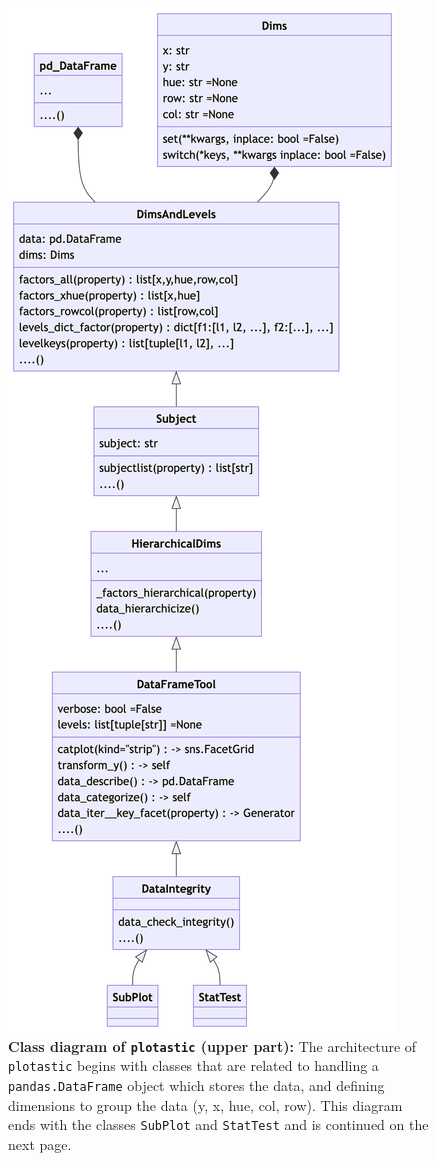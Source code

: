 \def\mycap{ \textbf{Class diagram of \texttt{plotastic} (upper part):} The
    architecture of \texttt{plotastic} begins with classes that are related to
    handling a \texttt{pandas.DataFrame} object which stores the data, and defining
    dimensions to group the data (y, x, hue, col, row). This diagram ends with the
    classes \texttt{SubPlot} and \texttt{StatTest} and is continued on the next
    page. \umlconvention }
\begin{figure}[H]
    \centering
    \includegraphics[scale=.18]{APPENDIX_CHAPTER2/classdiagr_dataframe.png}
    \caption{\mycap}
    \label{fig:classdiagr}
\end{figure}
\newpage

